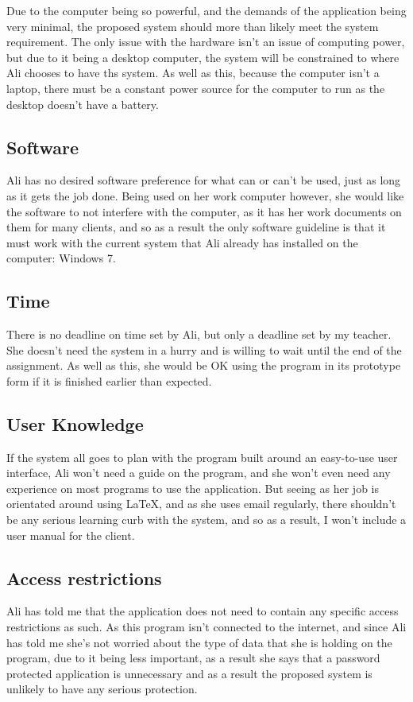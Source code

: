 Due to the computer being so powerful, and the demands of the application being very minimal, the proposed system should more than likely meet the system requirement. The only issue with the hardware isn't an issue of computing power, but due to it being a desktop computer, the system will be constrained to where Ali chooses to have ths system. As well as this, because the computer isn't a laptop, there must be a constant power source for the computer to run as the desktop doesn't have a battery.

\subsection{Software}
Ali has no desired software preference for what can or can't be used, just as long as it gets the job done. Being used on her work computer however, she would like the software to not interfere with the computer, as it has her work documents on them for many clients, and so as a result the only software guideline is that it must work with the current system that Ali already has installed on the computer: Windows 7.

\subsection{Time}
There is no deadline on time set by Ali, but only a deadline set by my teacher. She doesn't need the system in a hurry and is willing to wait until the end of the assignment. As well as this, she would be OK using the program in its prototype form if it is finished earlier than expected.

\subsection{User Knowledge}
If the system all goes to plan with the program built around an easy-to-use user interface, Ali won't need a guide on the program, and she won't even need any experience on most programs to use the application. But seeing as her job is orientated around using LaTeX, and as she uses email regularly, there shouldn't be any serious learning curb with the system, and so as a result, I won't include a user manual for the client.

\subsection{Access restrictions}
Ali has told me that the application does not need to contain any specific access restrictions as such. As this program isn't connected to the internet, and since Ali has told me she's not worried about the type of data that she is holding on the program, due to it being less important, as a result she says that a password protected application is unnecessary and as a result the proposed system is unlikely to have any serious protection.

